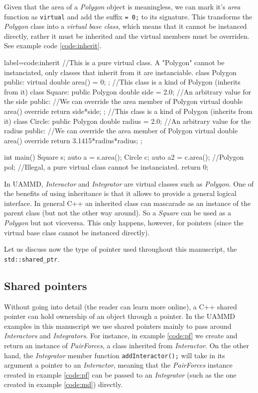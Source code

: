 \documentclass[ twoside,openright,titlepage,numbers=noenddot,%
headinclude,footinclude,cleardoublepage=empty,abstract=on,
BCOR=5mm,paper=a4,fontsize=11pt, dvipsnames
]{scrreprt}
\def\ucpp{uammd_cpp_lexer.py:UAMMDCppLexer -x}
\newcommand{\uammd}{\gls{UAMMD}\xspace}
\begin{document}
Given that the area of a \emph{Polygon} object is meaningless, we can mark it's \emph{area} function as \texttt{virtual} and add the suffix \texttt{= 0;} to its signature. This transforms the \emph{Polygon} class into a \emph{virtual base class}, which means that it cannot be instanced directly, rather it must be inherited and the virtual members must be overriden. See example code \ref{code:inherit}.
\begin{code2} {label=code:inherit}
  //This is a pure virtual class. A "Polygon" cannot be instanciated, only classes that inherit from it are instanciable.
  class Polygon{
    public:
    virtual double area() = 0;
  };
  //This class is a kind of Polygon (inherits from it)
  class Square: public Polygon{
    double side = 2.0; //An arbitrary value for the side
    public:
    //We can override the area member of Polygon
    virtual double area() override{
      return side*side;
    }
  };
  //This class is a kind of Polygon (inherits from it)
  class Circle: public Polygon{
    double radius = 2.0; //An arbitrary value for the radius
    public:
    //We can override the area member of Polygon
    virtual double area() override{
      return 3.1415*radius*radius;
    }
  };

  int main(){
    Square s;
    auto a = s.area();
    Circle c;
    auto a2 = c.area();
    //Polygon pol; //Illegal, a pure virtual class cannot be instanciated.
    return 0;  
  }
\end{code2}

In \uammd, \emph{Interactor} and \emph{Integrator} are virtual classes such as \emph{Polygon}. One of the benefits of using inheritance is that it allows to provide a general logical interface. In general C++ an inherited class can mascarade as an instance of the parent class (but not the other way around). So a \emph{Square} can be used as a \emph{Polygon} but not viceversa. This only happens, however, for pointers (since the virtual base class cannot be instanced directly).

Let us discuss now the type of pointer used throughout this manuscript, the \texttt{std::shared_ptr}.

\subsection*{Shared pointers}
Without going into detail (the reader can learn more online), a C++ shared pointer can hold ownership of an object through a pointer. In the \uammd examples in this manuscript we use shared pointers mainly to pass around \emph{Interactors} and \emph{Integrators}. For instance, in example \ref{code:pf} we create and return an instance of \emph{PairForces}, a class inherited from \emph{Interactor}. On the other hand, the \emph{Integrator} member function \texttt{addInteractor();} will take in its argument a pointer to an \emph{Interactor}, meaning that the \emph{PairForces} instance created in example \ref{code:pf} can be passed to an \emph{Integrator} (such as the one created in example \ref{code:md}) directly.
\end{document}
